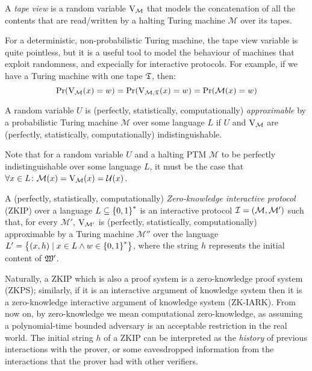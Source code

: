 \begin{definition}
  A \emph{tape view} is a random variable \(\mathrm{V}_{\mathcal{M}}\) that models the concatenation 
  of all the contents that are read/written by a halting Turing machine \(\mathcal{M}\) over its 
  tapes.
\end{definition}

For a deterministic, non-probabilistic Turing machine, the tape view variable is quite pointless, 
but it is a useful tool to model the behaviour of machines that exploit randomness, and expecially 
for interactive protocols.
For example, if we have a Turing machine with one tape \(\mathfrak{T} \), then:
\[
  \call{\Pr}{\call{\View_{\mathcal{M}}}{x} = w} = 
  \call{\Pr}{\call{\View_{\mathcal{M}, \Tape}}{x} = w} = 
  \call{\Pr}{\call{\mathcal{M}}{x} = w}
\]


\begin{definition}[Approximability]
  A random variable \(U\) is (perfectly, statistically, computationally) \emph{approximable} by a 
  probabilistic Turing machine \(\mathcal{M}\) over some language \(L\) if \(U\) and 
  \(\mathrm{V}_{\mathcal{M}}\) are (perfectly, statistically, computationally) indistinguishable.
\end{definition}

Note that for a random variable \(U\) and a halting PTM \(\mathcal{M}\) to be perfectly 
indistinguishable over some language \(L\), it must be the case that 
\(\forall x \in L\colon \call{\mathcal{M}}{x} = \call{\View_{\mathcal{M}}}{x} = \call{\mathcal{U}}{x}\).

\begin{definition}
  A (perfectly, statistically, computationally) \emph{Zero-knowledge interactive protocol} (ZKIP) 
  over a language \(L \subseteq \left\{0, 1\right\}^{*}\) is an interactive protocol 
  \(\mathcal{I} = \left(\mathcal{M}, \mathcal{M}'\right)\) such that, for every \(\mathcal{M'}\),
  \(\mathrm{V}_{\mathcal{M'}}\) is (perfectly, statistically, computationally) approximable by a 
  Turing machine \(\mathcal{M}''\) over the language 
  \(L' = \left\{\left(x, h\right) \mid x \in L \wedge w \in \left\{0, 1\right\}^*\right\}\), where the string
  \(h\) represents the initial content of \(\mathfrak{W}'\).
\end{definition}

Naturally, a ZKIP which is also a proof system is a zero-knowledge proof system (ZKPS); similarly, 
if it is an interactive argument of knowledge system then it is a zero-knowledge interactive 
argument of knowledge system (ZK-IARK).
From now on, by zero-knowledge we mean computational zero-knowledge, as assuming a polynomial-time 
bounded adversary is an acceptable restriction in the real world.
The initial string \(h\) of a ZKIP can be interpreted as the \emph{history} of previous 
interactions with the prover, or some eavesdropped information from the interactions that the 
prover had with other verifiers.

